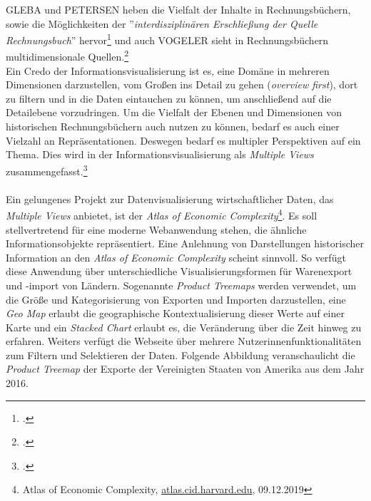 \documentclass[12pt,a4paper]{article}
\begin{document}
GLEBA und PETERSEN heben die Vielfalt der Inhalte in Rechnungsbüchern, sowie die Möglichkeiten der ''\textit{interdisziplinären Erschließung der Quelle Rechnungsbuch}'' hervor\footcite[][S.7-10]{gleba2015wirtschafts} und auch VOGELER sieht in Rechnungsbüchern multidimensionale Quellen.\footcite[][]{vogeler2016content}
\\
Ein Credo der Informationsvisualisierung ist es, eine Domäne in mehreren Dimensionen darzustellen, vom Großen ins Detail zu gehen (\textit{overview first}), dort zu filtern und in die Daten eintauchen zu können, um anschließend auf die Detailebene vorzudringen. Um die Vielfalt der Ebenen und Dimensionen von historischen Rechnungsbüchern auch nutzen zu können, bedarf es auch einer Vielzahl an Repräsentationen. Deswegen bedarf es multipler Perspektiven auf ein Thema. Dies wird in der Informationsvisualisierung als \textit{Multiple Views} zusammengefasst.\footcite[][S.452-462]{preim2010interaktive}
\\
\\
Ein gelungenes Projekt zur Datenvisualisierung wirtschaftlicher Daten, das \textit{Multiple Views} anbietet, ist der \textit{Atlas of Economic Complexity}\footnote{Atlas of Economic Complexity, \url{atlas.cid.harvard.edu}, 09.12.2019}. Es soll stellvertretend für eine moderne Webanwendung stehen, die ähnliche Informationsobjekte repräsentiert. Eine Anlehnung von Darstellungen historischer Information an den \textit{Atlas of Economic Complexity} scheint sinnvoll. So verfügt diese Anwendung über unterschiedliche Visualisierungsformen für Warenexport und -import von Ländern. Sogenannte \textit{Product Treemaps} werden verwendet, um die Größe und Kategorisierung von Exporten und Importen darzustellen, eine \textit{Geo Map} erlaubt die geographische Kontextualisierung dieser Werte auf einer Karte und ein \textit{Stacked Chart} erlaubt es, die Veränderung über die Zeit hinweg zu erfahren. Weiters verfügt die Webseite über mehrere Nutzerinnenfunktionalitäten zum Filtern und Selektieren der Daten. Folgende Abbildung veranschaulicht die \textit{Product Treemap} der Exporte der Vereinigten Staaten von Amerika aus dem Jahr 2016.
\end{document}
